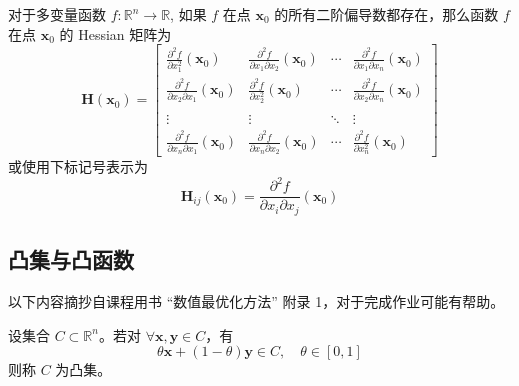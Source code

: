 \documentclass[cn]{elegantpaper}
\begin{document}
\begin{definition}[Hessian 矩阵]
    对于多变量函数 $f:\mathbb{R}^{n}\rightarrow\mathbb{R}$, 如果 $f$ 在点 $\mathbf{x}_{0}$ 的所有二阶偏导数都存在，那么函数 $f$ 在点 $\mathbf{x}_{0}$ 的 Hessian 矩阵为
    \begin{equation}
        \boldsymbol{H}(\mathbf{x}_{0})=\left[\begin{array}{cccc}
                \frac{\partial^{2} f}{\partial x_{1}^{2}}(\mathbf{x}_{0})            & \frac{\partial^{2} f}{\partial x_{1} \partial x_{2}}(\mathbf{x}_{0}) & \cdots & \frac{\partial^{2} f}{\partial x_{1} \partial x_{n}}(\mathbf{x}_{0}) \\
                \frac{\partial^{2} f}{\partial x_{2} \partial x_{1}}(\mathbf{x}_{0}) & \frac{\partial^{2} f}{\partial x_{2}^{2}}(\mathbf{x}_{0})            & \cdots & \frac{\partial^{2} f}{\partial x_{2} \partial x_{n}}(\mathbf{x}_{0}) \\
                                                                                     &                                                                      &        &                                                                      \\
                \vdots                                                               & \vdots                                                               & \ddots & \vdots                                                               \\
                \frac{\partial^{2} f}{\partial x_{n} \partial x_{1}}(\mathbf{x}_{0}) & \frac{\partial^{2} f}{\partial x_{n} \partial x_{2}}(\mathbf{x}_{0}) & \cdots & \frac{\partial^{2} f}{\partial x_{n}^{2}}(\mathbf{x}_{0})
            \end{array}\right]
    \end{equation}
    或使用下标记号表示为
    \begin{equation}
        \boldsymbol{H}_{i j}(\mathbf{x}_{0})=\frac{\partial^{2} f}{\partial x_{i} \partial x_{j}}(\mathbf{x}_{0})
    \end{equation}
\end{definition}

\subsection{凸集与凸函数}

以下内容摘抄自课程用书 “数值最优化方法” 附录 1，对于完成作业可能有帮助。

\begin{definition}[凸集]
    设集合 $C\subset\mathbb{R}^{n}$。若对 $\forall\mathbf{x},\mathbf{y}\in C$，有
    \begin{equation}
        \theta \mathbf{x}+(1-\theta)\mathbf{y}\in C,\quad\theta\in[0,1]
    \end{equation}
    则称 $C$ 为凸集。
\end{definition}
\end{document}
